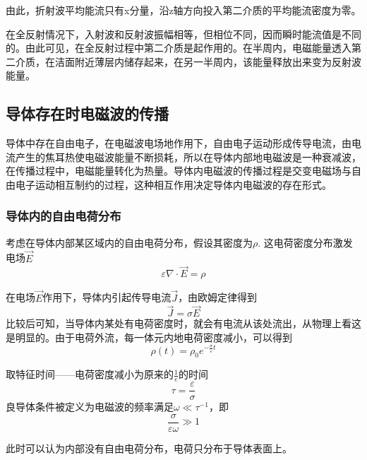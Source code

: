 \documentclass[UTF8]{ctexart}
\begin{document}
\noindent 由此，折射波平均能流只有x分量，沿z轴方向投入第二介质的平均能流密度为零。

    在全反射情况下，入射波和反射波振幅相等，但相位不同，因而瞬时能流值是不同的。由此可见，在全反射过程中第二介质是起作用的。在半周内，电磁能量透入第二介质，在洁面附近薄层内储存起来，在另一半周内，该能量释放出来变为反射波能量。

    \subsection{导体存在时电磁波的传播}
    导体中存在自由电子，在电磁波电场地作用下，自由电子运动形成传导电流，由电流产生的焦耳热使电磁波能量不断损耗，所以在导体内部地电磁波是一种衰减波，在传播过程中，电磁能量转化为热量。导体内电磁波的传播过程是交变电磁场与自由电子运动相互制约的过程，这种相互作用决定导体内电磁波的存在形式。

    \subsubsection{导体内的自由电荷分布}
    考虑在导体内部某区域内的自由电荷分布，假设其密度为$\rho$. 这电荷密度分布激发电场$\vec{E}$
    \begin{equation}
        \varepsilon \nabla \cdot \vec{E} = \rho 
    \end{equation}

\noindent 在电场$\vec{E}$作用下，导体内引起传导电流$\vec{J}$，由欧姆定律得到
\begin{equation}
    \vec{J}= \sigma \vec{E}
\end{equation}
\noindent 比较后可知，当导体内某处有电荷密度时，就会有电流从该处流出，从物理上看这是明显的。由于电荷外流，每一体元内地电荷密度减小，可以得到
\begin{equation}
    \rho(t) = \rho_0 e^{-\frac{\sigma}{\varepsilon}t} 
\end{equation}

    取特征时间——电荷密度减小为原来的$\frac{1}{e}$的时间
    \begin{equation}
        \tau = \frac{\varepsilon}{\sigma}
    \end{equation}
\noindent 良导体条件被定义为电磁波的频率满足$\omega \ll \tau^{-1}$，即
\begin{equation}
    \frac{\sigma}{\varepsilon \omega} \gg 1
\end{equation}

\noindent 此时可以认为内部没有自由电荷分布，电荷只分布于导体表面上。
\end{document}
